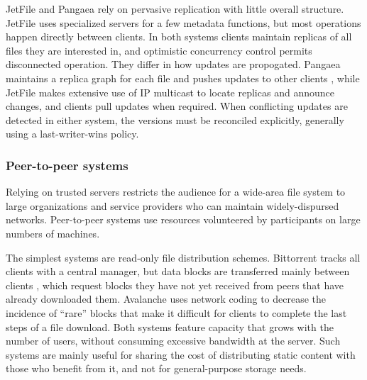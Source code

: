JetFile \cite{gronvall} and Pangaea \cite{saito02a} rely on pervasive replication with little overall structure. JetFile  uses specialized servers for a few metadata functions, but most operations happen directly between clients. In both systems clients maintain replicas of all files they are interested in, and optimistic concurrency control permits disconnected operation. They differ in how updates are propogated. Pangaea maintains a replica graph for each file and pushes updates to other clients \cite{saito02b}, while JetFile makes extensive use of IP multicast to locate replicas and announce changes, and clients pull updates when required. When conflicting updates are detected in either system, the versions must be reconciled explicitly, generally using a last-writer-wins policy.


\subsubsection{Peer-to-peer systems}

Relying on trusted servers restricts the audience for a wide-area file system to large organizations and service providers who can maintain widely-dispursed networks. Peer-to-peer systems use resources volunteered by participants on large numbers of machines.

The simplest systems are read-only file distribution schemes. Bittorrent tracks all clients with a central manager, but data blocks are transferred mainly between clients \cite{cohen,pouwelse}, which request blocks they have not yet received from peers that have already downloaded them. Avalanche \cite{gkantsidis} uses network coding to decrease the incidence of ``rare'' blocks that make it difficult for clients to complete the last steps of a file download. Both systems feature capacity that grows with the number of users, without consuming excessive bandwidth at the server. Such systems are mainly useful for sharing the cost of distributing static content with those who benefit from it, and not for general-purpose storage needs.

